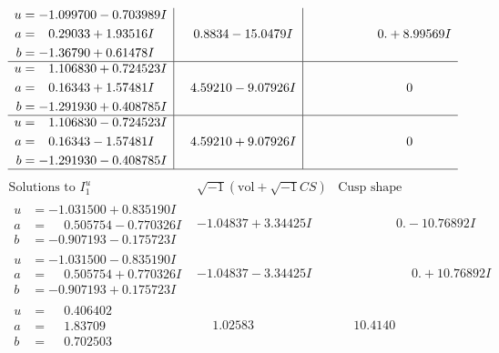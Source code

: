 \documentclass[1p]{elsarticle_modified}
\theoremstyle{definition}
\newcommand{\I}{\sqrt{-1}}
\begin{document}
$$\begin{array}{c|c|c}
\begin{aligned}
u &= -1.099700 - 0.703989 I \\
a &= \phantom{-}0.29033 + 1.93516 I \\
b &= -1.36790 + 0.61478 I\end{aligned}
 & \phantom{-}0.8834 - 15.0479 I & \phantom{-0.000000 -}0. + 8.99569 I \\ \hline\begin{aligned}
u &= \phantom{-}1.106830 + 0.724523 I \\
a &= \phantom{-}0.16343 + 1.57481 I \\
b &= -1.291930 + 0.408785 I\end{aligned}
 & \phantom{-}4.59210 - 9.07926 I & \phantom{-0.000000 } 0 \\ \hline\begin{aligned}
u &= \phantom{-}1.106830 - 0.724523 I \\
a &= \phantom{-}0.16343 - 1.57481 I \\
b &= -1.291930 - 0.408785 I\end{aligned}
 & \phantom{-}4.59210 + 9.07926 I & \phantom{-0.000000 } 0\\
 \hline 
 \end{array}$$\newpage$$\begin{array}{c|c|c}  
\text{Solutions to }I^u_{1}& \I (\text{vol} + \sqrt{-1}CS) & \text{Cusp shape}\\
 \hline 
\begin{aligned}
u &= -1.031500 + 0.835190 I \\
a &= \phantom{-}0.505754 - 0.770326 I \\
b &= -0.907193 - 0.175723 I\end{aligned}
 & -1.04837 + 3.34425 I & \phantom{-0.000000 } 0. - 10.76892 I \\ \hline\begin{aligned}
u &= -1.031500 - 0.835190 I \\
a &= \phantom{-}0.505754 + 0.770326 I \\
b &= -0.907193 + 0.175723 I\end{aligned}
 & -1.04837 - 3.34425 I & \phantom{-0.000000 -}0. + 10.76892 I \\ \hline\begin{aligned}
u &= \phantom{-}0.406402\phantom{ +0.000000I} \\
a &= \phantom{-}1.83709\phantom{ +0.000000I} \\
b &= \phantom{-}0.702503\phantom{ +0.000000I}\end{aligned}
 & \phantom{-}1.02583\phantom{ +0.000000I} & \phantom{-}10.4140\phantom{ +0.000000I} \\ \hline\begin{aligned}

\end{aligned}
\end{array}$$
\end{document}
